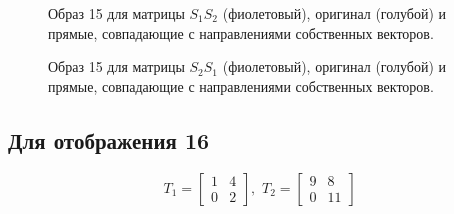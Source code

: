 \documentclass[a5paper, 10pt]{article}
\theoremstyle{definition}
\theoremstyle{plain}
\theoremstyle{remark}
\begin{document}
\newpage
\begin{figure}[h!]
\caption{Образ 15 для матрицы $S_1 S_2$ (фиолетовый), оригинал (голубой) и прямые, совпадающие с направлениями собственных векторов.}
\end{figure}

\newpage
\begin{figure}[h!]
\caption{Образ 15 для матрицы $S_2 S_1$ (фиолетовый), оригинал (голубой) и прямые, совпадающие с направлениями собственных векторов.}
\end{figure}

\newpage
\subsection{Для отображения 16}
\begin{equation}
T_1 =
\begin{bmatrix}
1 & 4\\
0 & 2
\end{bmatrix}
, \, \, 
T_2 =
\begin{bmatrix}
9 & 8\\
0 & 11
\end{bmatrix}
\end{equation}
\end{document}
